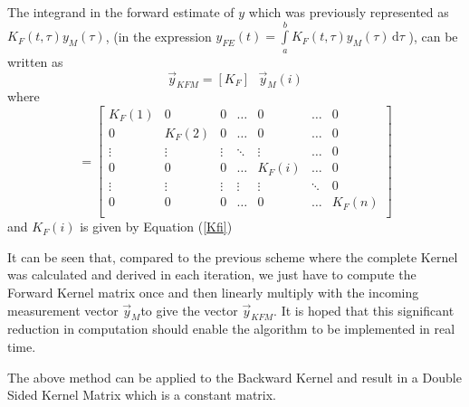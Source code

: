 \documentclass{article}
\begin{document}
The integrand in the forward estimate of $y$ which was previously represented as
$K_F(t,\tau) y_M(\tau)$, 
(in the expression $y_{FE}(t) =\int\limits_{a}^{b}K_F(t,\tau) y_M(\tau)\, \mathrm{d}\tau $ ), 
can be written as 
$$ \vec{y}_{KFM} = [K_F] \textrm{ } \vec{y}_M(i)$$
where 
\begin{equation*}
[K_F] =
\begin{bmatrix}
    K_F(1) &    0   &   0    & \dots  &    0    & \dots  &   0 \\
      0    & K_F(2) &   0    & \dots  &    0    & \dots  &   0 \\
    \vdots & \vdots & \vdots & \ddots & \vdots  & \dots  &   0 \\
      0    &   0    &   0    & \dots  &  K_F(i) & \dots  &   0 \\ 
    \vdots & \vdots & \vdots & \vdots & \vdots  & \ddots &   0 \\
      0    &   0    &   0    & \dots  &    0    & \dots  &   K_F(n) \\
\end{bmatrix}
\end{equation*}
and $K_F(i)$ is given by Equation (\ref{Kfi})

It can be seen that, compared to the previous scheme where the complete Kernel was calculated and derived in each iteration, we just have to compute the Forward Kernel matrix once and then linearly multiply with the incoming measurement vector $\vec{y}_M$to give the vector $\vec{y}_{KFM}$.
It is hoped that this significant reduction in computation should enable the algorithm to be implemented in real time. 

The above method can be applied to the Backward Kernel and result in a Double Sided Kernel Matrix which is a constant matrix.
\end{document}
